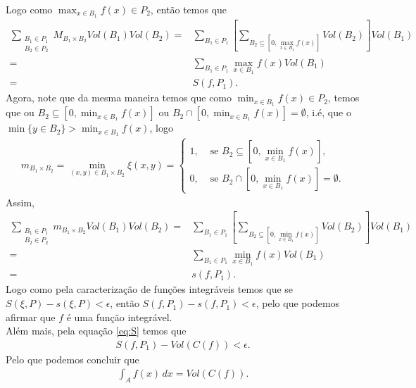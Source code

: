 \begin{homeworkProblem}[Seção 3-5]
\begin{solution}
    Logo como $\displaystyle \max_{x\in B_1}f(x)\in P_2$, então temos que
    \begin{align*}
      \sum_{\substack{B_1\in P_1\\ B_2\in P_2}}M_{B_1\times B_2}Vol(B_1)Vol(B_2)=&\sum_{ B_1\in P_1}\left[\sum_{B_2\subseteq \left[0,\max_{x\in B_1}f(x)\right]}Vol(B_2)\right]Vol(B_1)\\
      =&\sum_{B_1\in P_1}\max_{x\in B_1}f(x)Vol(B_1)\\
      =&S(f,P_1).
    \end{align*}
    Agora, note que da mesma maneira temos que como $\min_{x\in B_1}f(x)\in P_2$, temos que ou $B_2\subseteq [0,\min_{x\in B_1}f(x)]$ ou $B_2\cap [0,\min_{x\in B_1}f(x)]=\emptyset$, i.é, que o $\min\{y\in B_2\}> \min_{x\in B_1}f(x)$, logo
    \begin{align*}
      m_{B_1\times B_2}=\min_{(x,y)\in B_1\times B_2}\xi(x,y)=\begin{cases}
        1, &\text{ se } B_2\subseteq\displaystyle \left[0,\min_{x\in B_1}f(x)\right]  \text{,} \\
        0, &\text{ se } B_2\cap \displaystyle\left[0,\min_{x\in B_1}f(x)\right]=\emptyset.
      \end{cases}
    \end{align*}
    Assim,
    \begin{align*}
      \sum_{\substack{B_1\in P_1\\ B_2\in P_2}}m_{B_1\times B_2}Vol(B_1)Vol(B_2)=&\sum_{B_1\in P_1}\left[\sum_{B_2\subseteq \left[0,\min_{x\in B_1}f(x)\right]}Vol(B_2)\right]Vol(B_1)\\
      =&\sum_{B_1\in P_1}\min_{x\in B_1}f(x)Vol(B_1)\\
      =&s(f,P_1).      
    \end{align*}
    Logo como pela caracterização de funções integráveis temos que se $S(\xi,P)-s(\xi,P)<\epsilon$, então $S(f,P_1)-s(f,P_1)<\epsilon$, pelo que podemos afirmar que $f$ é uma função integrável.\\
    Além mais, pela equação \eqref{eq:S} temos que
    \begin{align*}
      S(f,P_1)-Vol(C(f))<\epsilon.
    \end{align*}
    Pelo que podemos concluir que
    \begin{align*}
      \int_{A}f(x)\,dx=Vol(C(f)).
    \end{align*}
  \end{solution}
\end{homeworkProblem}
